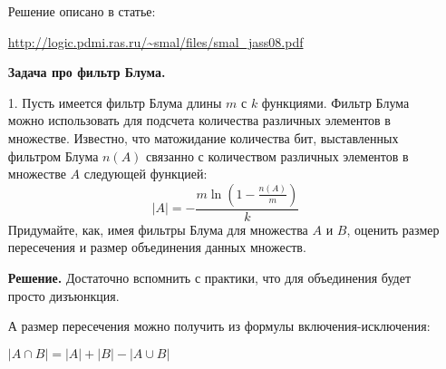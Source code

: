 \begin{enumerate}
	Решение описано в статье:
	
	\url{http://logic.pdmi.ras.ru/~smal/files/smal_jass08.pdf}
	
	\textbf{Задача про фильтр Блума.}
	
	\item[1.] Пусть имеется фильтр Блума длины $m$ с $k$ функциями. Фильтр Блума можно использовать для подсчета количества 
	различных элементов в множестве. Известно, что матожидание количества бит, выставленных фильтром Блума $n(A)$ 
	связанно с количеством различных элементов в множестве $A$ следующей функцией:
	\begin{equation}
		|A| = - \dfrac{m \ln (1-\frac{n(A)}{m})}{k}
	\end{equation}
	Придумайте, как, имея фильтры Блума для множества $A$ и $B$, оценить размер пересечения и размер объединения 
	данных множеств.
	
	\textbf{Решение.} Достаточно вспомнить с практики, что для объединения будет просто дизъюнкция. 
	
	А размер пересечения можно получить из формулы включения-исключения:
	
	$|A \cap B| = |A| + |B| - |A \cup B|$
	
\end{enumerate}


